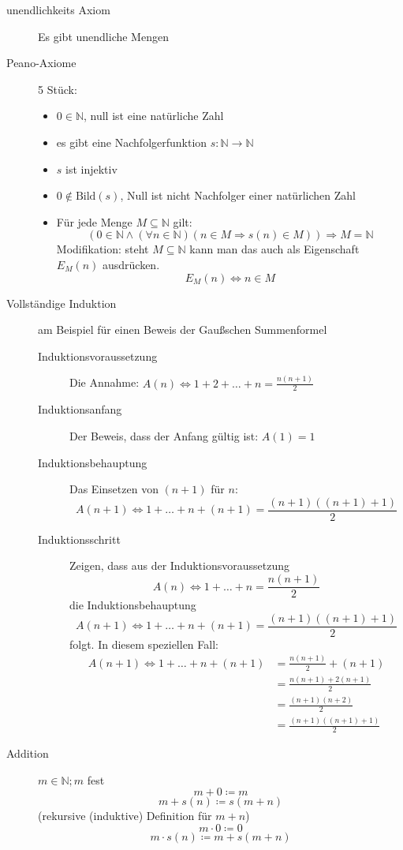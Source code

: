 \begin{description}
    \item[unendlichkeits Axiom] Es gibt unendliche Mengen
    \item[Peano-Axiome] 5 Stück:
    \begin{itemize}
        \item $0 \in \mathbb{N}$, null ist eine natürliche Zahl
        \item es gibt eine Nachfolgerfunktion $s : \mathbb{N} \longrightarrow \mathbb{N}$
        \item $s$ ist injektiv
        \item $0 \not \in \textrm{Bild}(s)$, Null ist nicht Nachfolger einer natürlichen Zahl
        \item Für jede Menge $M \subseteq \mathbb{N}$ gilt:
        $$(0 \in \mathbb{N} \wedge (\forall n \in \mathbb{N})(n \in M \Rightarrow s(n) \in M)) \Rightarrow M = \mathbb{N}$$
        Modifikation: steht $M \subseteq \mathbb{N}$ kann man das auch als Eigenschaft $E_M(n)$ ausdrücken.
        $$E_M(n) \Leftrightarrow n \in M$$
    \end{itemize}
    \item[Vollständige Induktion] am Beispiel für einen Beweis der Gaußschen Summenformel
    \begin{description}
        \item[Induktionsvoraussetzung] Die Annahme: $A(n) \Leftrightarrow 1 + 2 + \dots + n = \frac{n(n+1)}{2}$
        \item[Induktionsanfang] Der Beweis, dass der Anfang gültig ist: $A(1) = 1$
        \item[Induktionsbehauptung] Das Einsetzen von $(n + 1)$ für $n$:
        $$A(n + 1) \Leftrightarrow 1 + \dots + n + (n + 1)= \frac{(n + 1)((n + 1)+1)}{2}$$
        \item[Induktionsschritt] Zeigen, dass aus der Induktionsvoraussetzung
        $$A(n) \Leftrightarrow 1 + \dots + n = \frac{n(n+1)}{2}$$
        die Induktionsbehauptung
        $$A(n + 1) \Leftrightarrow 1 + \dots + n + (n + 1) = \frac{(n + 1)((n + 1)+1)}{2}$$
        folgt. In diesem speziellen Fall:
        \begin{align*}
            A(n + 1) \Leftrightarrow 1 + \dots + n + (n + 1) & = \frac{n(n + 1)}{2} + (n + 1)  \\
            & = \frac{n(n + 1) + 2(n + 1)}{2} \\
            & = \frac{(n + 1)(n + 2)}{2}      \\
            & = \frac{(n + 1)((n + 1)+1)}{2}
        \end{align*}
    \end{description}
    \item[Addition] $m \in \mathbb{N}; m$ fest
    $$m+0\coloneqq m$$
    $$m + s(n) \coloneqq s(m + n)$$
    (rekursive (induktive) Definition für $m + n$)
    $$m \cdot 0\coloneqq 0$$
    $$m \cdot s(n) \coloneqq m + s(m + n)$$
\end{description}
